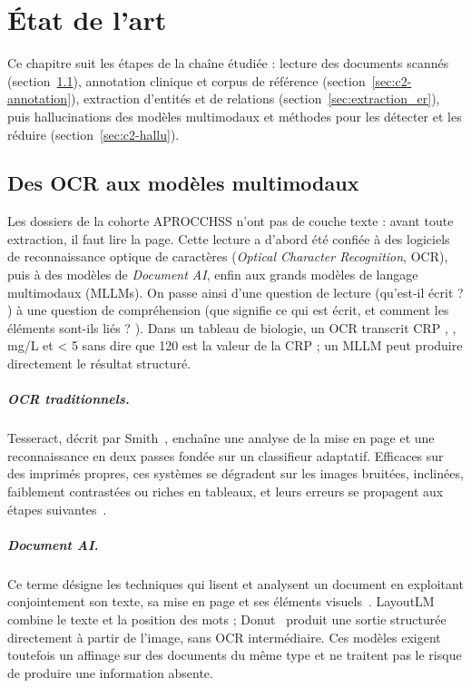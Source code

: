 \chapter{État de l'art}\label{chap:etat-art}

Ce chapitre suit les étapes de la chaîne étudiée : lecture des documents scannés (section~\ref{sec:c2-lecture}), annotation clinique et corpus de référence (section~\ref{sec:c2-annotation}), extraction d'entités et de relations (section~\ref{sec:extraction_er}), puis hallucinations des modèles multimodaux et méthodes pour les détecter et les réduire (section~\ref{sec:c2-hallu}).

\section{Des OCR aux modèles multimodaux}\label{sec:c2-lecture}

Les dossiers de la cohorte APROCCHSS n'ont pas de couche texte : avant toute extraction, il faut lire la page. Cette lecture a d'abord été confiée à des logiciels de reconnaissance optique de caractères (\textit{Optical Character Recognition}, OCR), puis à des modèles de \textit{Document AI}, enfin aux grands modèles de langage multimodaux (MLLMs). On passe ainsi d'une question de lecture (\og qu'est-il écrit ? \fg{}) à une question de compréhension (\og que signifie ce qui est écrit, et comment les éléments sont-ils liés ? \fg{}). Dans un tableau de biologie, un OCR transcrit \og CRP \fg{},  \fg{}, \og mg/L \fg{} et \og < 5 \fg{} sans dire que 120 est la valeur de la CRP ; un MLLM peut produire directement le résultat structuré.

\paragraph{OCR traditionnels.} Tesseract, décrit par Smith~\cite{smith2007tesseract}, enchaîne une analyse de la mise en page et une reconnaissance en deux passes fondée sur un classifieur adaptatif. Efficaces sur des imprimés propres, ces systèmes se dégradent sur les images bruitées, inclinées, faiblement contrastées ou riches en tableaux, et leurs erreurs se propagent aux étapes suivantes~\cite{zhang2025ocrhindersrag}.

\paragraph{\textit{Document AI}.} Ce terme désigne les techniques qui lisent et analysent un document en exploitant conjointement son texte, sa mise en page et ses éléments visuels~\cite{cui2021documentai}. LayoutLM~\cite{xu2020layoutlm} combine le texte et la position des mots ; Donut~\cite{kim2022donut} produit une sortie structurée directement à partir de l'image, sans OCR intermédiaire. Ces modèles exigent toutefois un affinage sur des documents du même type et ne traitent pas le risque de produire une information absente.


